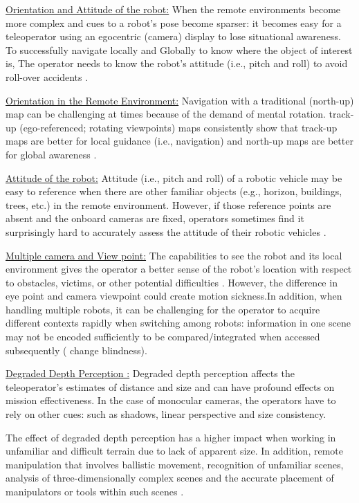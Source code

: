 \underline {Orientation and Attitude of the robot:} 
When the remote environments become more complex and cues to a robot’s pose become sparser: it becomes easy for a teleoperator using an egocentric (camera) display to lose situational awareness. To successfully navigate locally and Globally to know where the object of interest is, The operator needs to know the robot's attitude (i.e., pitch and roll) to avoid roll-over accidents \cite{wang2004gravity}.

\underline{Orientation in the Remote Environment:} Navigation with a traditional (north-up) map can be challenging at times because of the demand of mental rotation. track-up (ego-referenced; rotating viewpoints) maps consistently show that track-up maps are better for local guidance (i.e., navigation) and north-up maps are better for global awareness \cite{wang2004gravity}.

\underline{Attitude of the robot:} Attitude (i.e., pitch and roll) of a robotic vehicle may be easy to reference when there are other familiar objects (e.g., horizon, buildings, trees, etc.) in the remote environment. However, if those reference points are absent and the onboard cameras are fixed, operators sometimes find it surprisingly hard to accurately assess the attitude of their robotic vehicles \cite{wang2004gravity}.

\underline{Multiple camera and View point:}
The capabilities to see the robot and its local environment gives the operator a better sense of the robot’s location with respect to obstacles, victims, or other potential difficulties \cite{keyes2006camera}. However, the difference in eye point and camera viewpoint could create motion sickness.In addition, when handling multiple robots, it can be challenging for the operator to acquire different contexts rapidly when switching among robots: information in one scene may not be encoded sufficiently to be compared/integrated when accessed subsequently ( change blindness).

\underline{Degraded Depth Perception :}
Degraded depth perception affects the teleoperator’s estimates of distance and size and can have profound effects on mission effectiveness. In the case of monocular cameras, the operators have to rely on other cues: such as shadows, linear perspective and size consistency.

The effect of degraded depth perception has a higher impact when working in unfamiliar and difficult terrain due to lack of apparent size. In addition, remote manipulation that involves ballistic movement, recognition of unfamiliar scenes, analysis of three-dimensionally complex scenes and the accurate placement of manipulators or tools within such scenes \cite{drascic1993investigation}.

